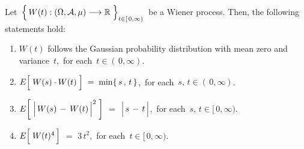 \vskip 0.5cm
\begin{proposition}
\label{WienerProcessBasicProperties}
\mbox{}
\vskip 0.2cm
\noindent
Let
\,$\left\{\,\overset{{\color{white}.}}{W}(t) : (\Omega,\mathcal{A},\mu) \longrightarrow \Re \;\right\}_{t \in[\,0,\infty)}$\,
be a Wiener process.
Then, the following statements hold:
\begin{enumerate}
\item
	$W(t)$ follows the Gaussian probability distribution with mean zero and variance \,$t$,\,
	for each \,$t \in (\,0,\infty)$.
\item
	$E\!\left[\;\overset{{\color{white}.}}{W(s)} \cdot W(t)\;\right] \; = \; \min\{\,s\,,\,t\,\}$,\,
	for each \,$s,\, t \in (\,0,\infty)$.
\item
	$E\!\left[\;\left\vert\,\overset{{\color{white}.}}{W(s)}\,-\,W(t)\,\right\vert^{2}\;\right]$
	\;$=$\;
	$\left\vert\,s\,\overset{{\color{white}.}}{-}\,t\,\right\vert$,\,
	for each \,$s,\, t \in [\,0,\infty)$.
\item
	$E\!\left[\; W(\overset{{\color{white}.}}{t})^{4} \,\right]$
	\;$=$\;
	$3\,t^{2}$,\,
	for each \,$t \in [\,0,\infty)$.
\end{enumerate}
\end{proposition}
\proof
